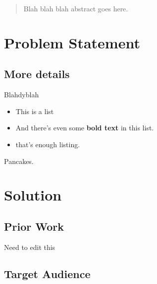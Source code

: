 \documentclass{acm_proc_article-sp}
\begin{document}
\maketitle
\begin{abstract}
Blah blah blah abstract goes here.
\end{abstract}




\section{Problem Statement}
    
	
	\subsection{More details}

    Blahdyblah

\begin{itemize}
	\item This is a list
	\item And there's even some \textbf{bold text} in this list.
	\item that's enough listing.
\end{itemize}

    Pancakes.
	
\section{Solution}

\subsection{Prior Work}

Need to edit this
	
\subsection{Target Audience}
	
\end{document}
